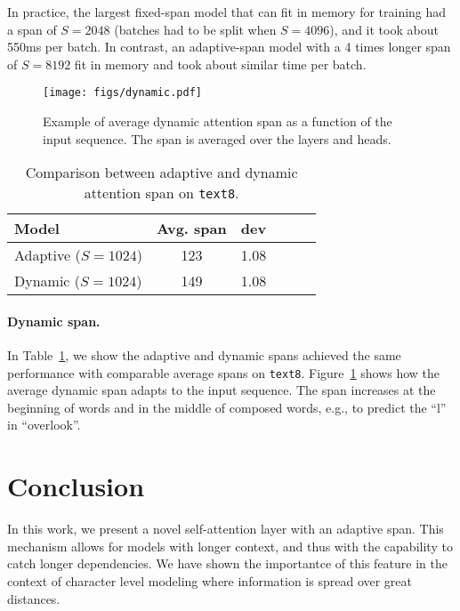 \documentclass[11pt,a4paper]{article}
\begin{document}
In practice, the largest fixed-span model that can fit in memory for training had a span of $S=2048$ (batches had to be split when $S=4096$), and it took about 550ms per batch. In contrast, an adaptive-span model with a 4 times longer span of $S=8192$ fit in memory and took about similar time per batch.

\begin{figure}[t]
\centering
\texttt{[image: figs/dynamic.pdf]}\\
\vspace{-2mm}
\caption{
  Example of average dynamic attention span as a function of the input sequence.
  The span is averaged over the layers and heads.}
\label{fig:dynamic}
\end{figure}

\begin{table}[t]
\centering
\begin{tabular}{lccccc}
  \toprule
  Model & Avg. span & dev \\
  \midrule
  Adaptive ($S=1024$) & 123 & 1.08\\
  Dynamic ($S=1024$) & 149 & 1.08 \\
  \bottomrule
\end{tabular}
  \caption{
    Comparison between adaptive and dynamic attention span on \texttt{text8}.
  }
  \vspace{-4mm}
\label{tab:dynamic}
\end{table}

\paragraph{Dynamic span.}
In Table~\ref{tab:dynamic}, we show the adaptive and dynamic spans achieved the same performance with comparable average spans on \texttt{text8}.
Figure~\ref{fig:dynamic} shows how the average dynamic span adapts to the input sequence.
The span increases at the beginning of words and in the middle of composed words, e.g., to predict the ``l'' in ``overlook''.
 
\section{Conclusion}
In this work, we present a novel self-attention layer with an adaptive span.
This mechanism allows for models with longer context, and thus with the capability to catch longer dependencies.
We have shown the importantce of this feature in the context of character level modeling where information is spread over great distances.





\end{document}
